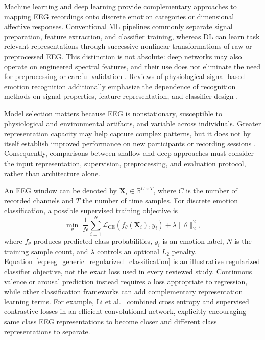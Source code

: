 \documentclass[ASNA,twocolumn]{USG}
\begin{document}
Machine learning and deep learning provide complementary approaches to mapping EEG recordings onto discrete emotion categories or dimensional affective responses. Conventional ML pipelines commonly separate signal preparation, feature extraction, and classifier training, whereas DL can learn task relevant representations through successive nonlinear transformations of raw or preprocessed EEG. This distinction is not absolute: deep networks may also operate on engineered spectral features, and their use does not eliminate the need for preprocessing or careful validation \cite{alarcao2017emotions,roy2019deep}. Reviews of physiological signal based emotion recognition additionally emphasize the dependence of recognition methods on signal properties, feature representation, and classifier design \cite{li2021physiological}.

Model selection matters because EEG is nonstationary, susceptible to physiological and environmental artifacts, and variable across individuals. Greater representation capacity may help capture complex patterns, but it does not by itself establish improved performance on new participants or recording sessions \cite{roy2019deep,wu2020transfer}. Consequently, comparisons between shallow and deep approaches must consider the input representation, supervision, preprocessing, and evaluation protocol, rather than architecture alone.

An EEG window can be denoted by $\mathbf{X}_i\in\mathbb{R}^{C\times T}$, where $C$ is the number of recorded channels and $T$ the number of time samples. For discrete emotion classification, a possible supervised training objective is
\begin{equation}
\min_{\theta}\;\frac{1}{N}\sum_{i=1}^{N}
\mathcal{L}_{\mathrm{CE}}\!\left(f_{\theta}(\mathbf{X}_i),y_i\right)
+\lambda\lVert\theta\rVert_2^2,
\label{eq:eeg_generic_regularized_classification}
\end{equation}
where $f_{\theta}$ produces predicted class probabilities, $y_i$ is an emotion label, $N$ is the training sample count, and $\lambda$ controls an optional $L_2$ penalty. Equation~\eqref{eq:eeg_generic_regularized_classification} is an illustrative regularized classifier objective, not the exact loss used in every reviewed study. Continuous valence or arousal prediction instead requires a loss appropriate to regression, while other classification frameworks can add complementary representation learning terms. For example, Li et al.~\cite{li2022eeg} combined cross entropy and supervised contrastive losses in an efficient convolutional network, explicitly encouraging same class EEG representations to become closer and different class representations to separate.
\end{document}
